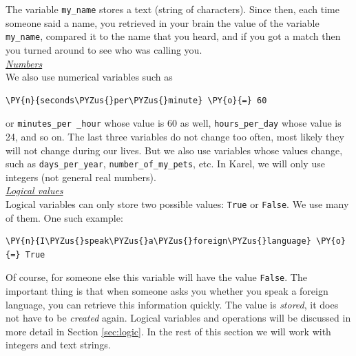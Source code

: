 \noindent
The variable {\tt my\_name} stores a text (string of characters). 
Since then, each time someone said a name, you retrieved in your brain the value of the variable
{\tt my\_name}, compared it to the name that you heard, and if you got a match then you turned around 
to see who was calling you. \\

\noindent
\underline{\em Numbers}\\

\noindent
We also use numerical variables such as\\

\begin{bbox}
\begin{Verbatim}[commandchars=\\\{\}]
\PY{n}{seconds\PYZus{}per\PYZus{}minute} \PY{o}{=} 60
\end{Verbatim}
\end{bbox}
\vspace{6mm}

\noindent
or {\tt minutes\_per \_hour} whose value is 60 as well, 
{\tt hours\_per\_day} whose value is 24, and so on. The last three variables do not change 
too often, most likely they will not change during our lives. But we also use variables whose 
values change, such as {\tt days\_per\_year}, {\tt number\_of\_my\_pets}, etc. In Karel, we
will only use integers (not general real numbers).\\

\noindent
\underline{\em Logical values}\\

\noindent
Logical variables can only store two possible values:
{\tt True} or {\tt False}. We use many of them. One such example: \\

\begin{bbox}
\begin{Verbatim}[commandchars=\\\{\}]
\PY{n}{I\PYZus{}speak\PYZus{}a\PYZus{}foreign\PYZus{}language} \PY{o}{=} True
\end{Verbatim}
\end{bbox}
\vspace{6mm}

\noindent
Of course, for someone else this variable will have the value {\tt False}. The important 
thing is that when someone asks you whether you speak a foreign language, you can retrieve 
this information quickly. The value is {\em stored}, it does not have to be {\em created}
again. Logical variables and operations will be discussed in more detail in Section 
\ref{sec:logic}. In the rest of this section we will work with integers and text strings.

